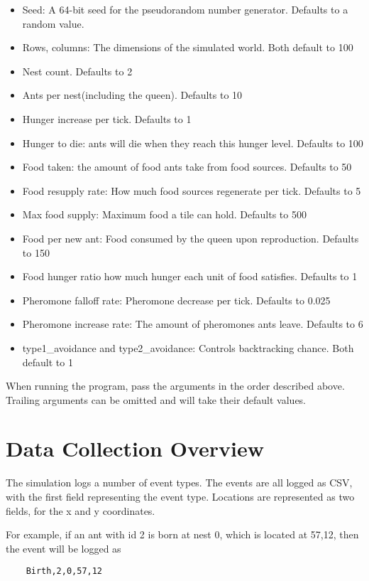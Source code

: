 \documentclass{article}
\begin{document}
\begin{itemize}
    \item Seed: A 64-bit seed for the pseudorandom number generator.  Defaults to a random value.
    \item Rows, columns: The dimensions of the simulated world.  Both default to 100
    \item Nest count.  Defaults to 2
    \item Ants per nest(including the queen).  Defaults to 10
    \item Hunger increase per tick.  Defaults to 1
    \item Hunger to die: ants will die when they reach this hunger level.  Defaults to 100
    \item Food taken: the amount of food ants take from food sources.  Defaults to 50
    \item Food resupply rate: How much food sources regenerate per tick.  Defaults to 5
    \item Max food supply: Maximum food a tile can hold.  Defaults to 500
    \item Food per new ant: Food consumed by the queen upon reproduction.  Defaults to 150
    \item Food hunger ratio how much hunger each unit of food satisfies.  Defaults to 1
    \item Pheromone falloff rate: Pheromone decrease per tick.  Defaults to 0.025
    \item Pheromone increase rate: The amount of pheromones ants leave. Defaults to 6
    \item type1\_avoidance and type2\_avoidance: Controls backtracking chance.  Both default to 1

\end{itemize}

When running the program, pass the arguments in the order described above.  Trailing arguments can be omitted and will take their default values.

\section{Data Collection Overview}

The simulation logs a number of event types.  The events are all logged as CSV, with the first field representing the event type.  Locations are represented as two fields, for the x and y coordinates.

For example, if an ant with id 2 is born at nest 0, which is located at {57,12}, then the event will be logged as
\begin{verbatim}
    Birth,2,0,57,12
\end{verbatim}
\end{document}
